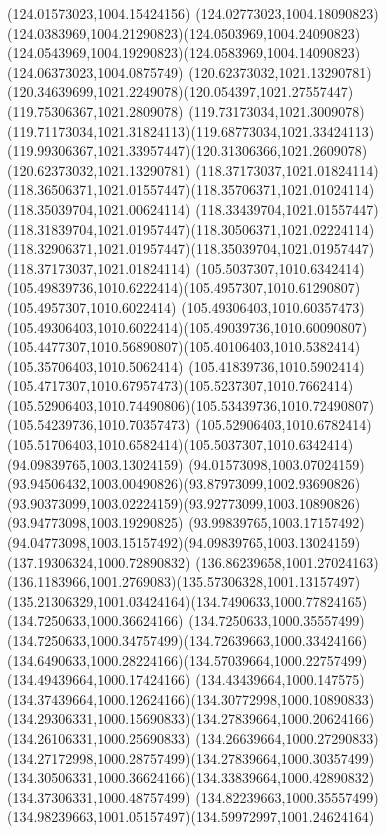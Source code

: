 {{  \moveto(124.01573023,1004.15424156)
  \curveto(124.02773023,1004.18090823)(124.0383969,1004.21290823)(124.0503969,1004.24090823)
  \curveto(124.0543969,1004.19290823)(124.0583969,1004.14090823)(124.06373023,1004.0875749)
  \closepath
  \moveto(120.62373032,1021.13290781)
  \curveto(120.34639699,1021.2249078)(120.054397,1021.27557447)(119.75306367,1021.2809078)
  \curveto(119.73173034,1021.3009078)(119.71173034,1021.31824113)(119.68773034,1021.33424113)
  \curveto(119.99306367,1021.33957447)(120.31306366,1021.2609078)(120.62373032,1021.13290781)
  \moveto(118.37173037,1021.01824114)
  \curveto(118.36506371,1021.01557447)(118.35706371,1021.01024114)(118.35039704,1021.00624114)
  \curveto(118.33439704,1021.01557447)(118.31839704,1021.01957447)(118.30506371,1021.02224114)
  \curveto(118.32906371,1021.01957447)(118.35039704,1021.01957447)(118.37173037,1021.01824114)
  \moveto(105.5037307,1010.6342414)
  \curveto(105.49839736,1010.6222414)(105.4957307,1010.61290807)(105.4957307,1010.6022414)
  \curveto(105.49306403,1010.60357473)(105.49306403,1010.6022414)(105.49039736,1010.60090807)
  \curveto(105.4477307,1010.56890807)(105.40106403,1010.5382414)(105.35706403,1010.5062414)
  \curveto(105.41839736,1010.5902414)(105.4717307,1010.67957473)(105.5237307,1010.7662414)
  \curveto(105.52906403,1010.74490806)(105.53439736,1010.72490807)(105.54239736,1010.70357473)
  \curveto(105.52906403,1010.6782414)(105.51706403,1010.6582414)(105.5037307,1010.6342414)
  \moveto(94.09839765,1003.13024159)
  \curveto(94.01573098,1003.07024159)(93.94506432,1003.00490826)(93.87973099,1002.93690826)
  \curveto(93.90373099,1003.02224159)(93.92773099,1003.10890826)(93.94773098,1003.19290825)
  \curveto(93.99839765,1003.17157492)(94.04773098,1003.15157492)(94.09839765,1003.13024159)
  \moveto(137.19306324,1000.72890832)
  \curveto(136.86239658,1001.27024163)(136.1183966,1001.2769083)(135.57306328,1001.13157497)
  \curveto(135.21306329,1001.03424164)(134.7490633,1000.77824165)(134.7250633,1000.36624166)
  \curveto(134.7250633,1000.35557499)(134.7250633,1000.34757499)(134.72639663,1000.33424166)
  \curveto(134.6490633,1000.28224166)(134.57039664,1000.22757499)(134.49439664,1000.17424166)
  \curveto(134.43439664,1000.147575)(134.37439664,1000.12624166)(134.30772998,1000.10890833)
  \curveto(134.29306331,1000.15690833)(134.27839664,1000.20624166)(134.26106331,1000.25690833)
  \curveto(134.26639664,1000.27290833)(134.27172998,1000.28757499)(134.27839664,1000.30357499)
  \curveto(134.30506331,1000.36624166)(134.33839664,1000.42890832)(134.37306331,1000.48757499)
  \curveto(134.82239663,1000.35557499)(134.98239663,1001.05157497)(134.59972997,1001.24624164)
}}
